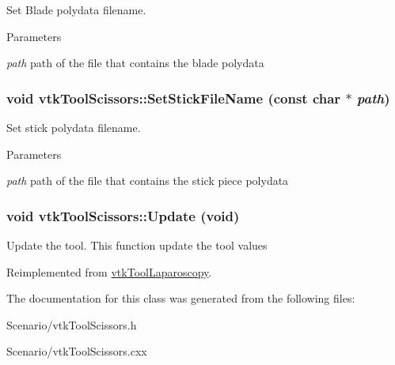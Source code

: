 Set Blade polydata filename. 
\begin{DoxyParams}{Parameters}
\item[{\em path}]path of the file that contains the blade polydata \end{DoxyParams}
\hypertarget{classvtkToolScissors_a22475f67e31779d51b49af9a875269f7}{
\subsubsection[{SetStickFileName}]{\setlength{\rightskip}{0pt plus 5cm}void vtkToolScissors::SetStickFileName (const char $\ast$ {\em path})}}
\label{classvtkToolScissors_a22475f67e31779d51b49af9a875269f7}


Set stick polydata filename. 
\begin{DoxyParams}{Parameters}
\item[{\em path}]path of the file that contains the stick piece polydata \end{DoxyParams}
\hypertarget{classvtkToolScissors_afe574b6b9e809f746308a157b6525c4b}{
\subsubsection[{Update}]{\setlength{\rightskip}{0pt plus 5cm}void vtkToolScissors::Update (void)}}
\label{classvtkToolScissors_afe574b6b9e809f746308a157b6525c4b}


Update the tool. This function update the tool values 

Reimplemented from \hyperlink{classvtkToolLaparoscopy_a4445a0cfabd77b50a06929b04cb71f9e}{vtkToolLaparoscopy}.

The documentation for this class was generated from the following files:\begin{DoxyCompactItemize}
\item 
Scenario/vtkToolScissors.h\item 
Scenario/vtkToolScissors.cxx\end{DoxyCompactItemize}
